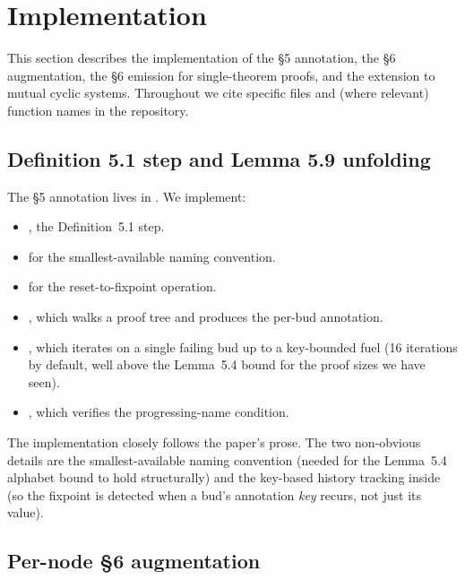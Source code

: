 \section{Implementation}
\label{sec:implementation}

This section describes the implementation of the §5 annotation, the §6
augmentation, the §6 emission for single-theorem proofs, and the extension
to mutual cyclic systems. Throughout we cite specific files and (where
relevant) function names in the repository.

\subsection{Definition 5.1 step and Lemma 5.9 unfolding}
\label{sec:impl-paper-annot}

The §5 annotation lives in . We
implement:
\begin{itemize}
  \item {}, the
    Definition~5.1 step.
  \item {} for the
    smallest-available naming convention.
  \item {} for the reset-to-fixpoint operation.
  \item {}, which walks
    a proof tree and produces the per-bud annotation.
  \item {}, which iterates  on a
    single failing bud up to a key-bounded fuel (16 iterations by
    default, well above the Lemma~5.4 bound for the proof sizes we have
    seen).
  \item {}, which verifies the
    progressing-name condition.
\end{itemize}

The implementation closely follows the paper's prose. The two
non-obvious details are the smallest-available naming convention
(needed for the Lemma~5.4 alphabet bound to hold structurally) and the
key-based history tracking inside  (so the fixpoint
is detected when a bud's annotation \emph{key} recurs, not just its value).

\subsection{Per-node §6 augmentation}
\label{sec:impl-aug}

